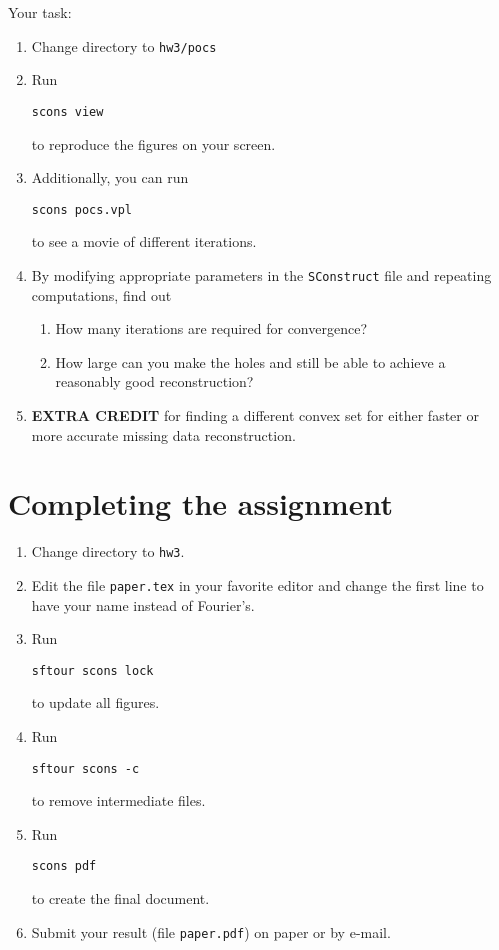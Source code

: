 Your task:
\begin{enumerate}
\item Change directory to \texttt{hw3/pocs}
\item Run 
\begin{verbatim}
scons view
\end{verbatim}
to reproduce the figures on your screen.
\item Additionally, you can run
\begin{verbatim}
scons pocs.vpl
\end{verbatim}
to see a movie of different iterations.
\item By modifying appropriate parameters in the \texttt{SConstruct} file and repeating computations,
find out
\begin{enumerate}
\item How many iterations are required for convergence?
\item How large can you make the holes and still be able to achieve a reasonably good reconstruction?
\end{enumerate}
\item \textbf{EXTRA CREDIT} for finding a different convex set for either faster or more accurate missing data reconstruction.
\end{enumerate}

\section{Completing the assignment}

\begin{enumerate}
\item Change directory to \texttt{hw3}.
\item Edit the file \texttt{paper.tex} in your favorite editor and change the
  first line to have your name instead of Fourier's.
\item Run
\begin{verbatim}
sftour scons lock
\end{verbatim}
to update all figures.
\item Run
\begin{verbatim}
sftour scons -c
\end{verbatim}
to remove intermediate files.
\item Run
\begin{verbatim}
scons pdf
\end{verbatim}
to create the final document.
\item Submit your result (file \texttt{paper.pdf}) on paper or by
e-mail.
\end{enumerate}



